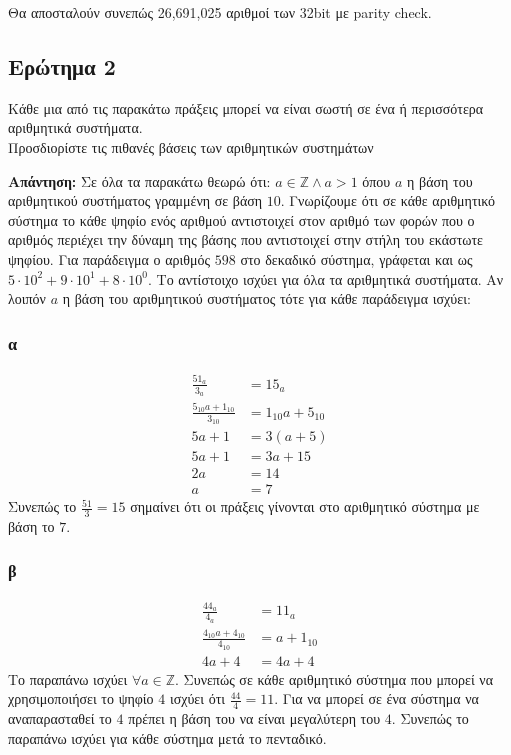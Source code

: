 \documentclass[]{article}
\begin{document}
Θα αποσταλούν συνεπώς 26,691,025 αριθμοί των 32bit με parity check.

\subsection{Ερώτημα 2}
Κάθε μια από τις παρακάτω πράξεις μπορεί να είναι σωστή σε ένα ή περισσότερα αριθμητικά συστήματα. \\
Προσδιορίστε τις πιθανές βάσεις των αριθμητικών συστημάτων

\textbf{Απάντηση: }
Σε όλα τα παρακάτω θεωρώ ότι: $a \in \mathbb{Z} \land a > 1$ όπου $a$ η βάση του αριθμητικού συστήματος γραμμένη σε βάση $10$.
Γνωρίζουμε ότι σε κάθε αριθμητικό σύστημα το κάθε ψηφίο ενός αριθμού αντιστοιχεί στον αριθμό των φορών που ο αριθμός περιέχει την δύναμη της βάσης που αντιστοιχεί στην στήλη του εκάστωτε ψηφίου.
Για παράδειγμα ο αριθμός $598$ στο δεκαδικό σύστημα, γράφεται και ως $5 \cdot 10^2 + 9 \cdot 10^1 + 8 \cdot 10^0$. Το αντίστοιχο ισχύει για όλα τα αριθμητικά συστήματα.
Αν λοιπόν $a$ η βάση του αριθμητικού συστήματος τότε για κάθε παράδειγμα ισχύει:
\subsubsection{α}
\begin{align*}
	\frac{51_a}{3_a}                & = 15_a             \\
	\frac{5_{10}a + 1_{10}}{3_{10}} & = 1_{10}a + 5_{10} \\
	5a + 1                          & = 3(a + 5)         \\
	5a + 1                          & = 3a + 15          \\
	2a                              & = 14               \\
	a                               & = 7
\end{align*}
Συνεπώς το $\frac{51}{3} = 15$ σημαίνει ότι οι πράξεις γίνονται στο αριθμητικό σύστημα με βάση το $7$.

\subsubsection{β}
\begin{align*}
	\frac{44_a}{4_a}                & = 11_a       \\
	\frac{4_{10}a + 4_{10}}{4_{10}} & = a + 1_{10} \\
	4a + 4                          & = 4a + 4
\end{align*}
Το παραπάνω ισχύει $\forall a \in \mathbb{Z}$. Συνεπώς σε κάθε αριθμητικό σύστημα που μπορεί να χρησιμοποιήσει το ψηφίο $4$ ισχύει ότι $\frac{44}{4} = 11$.
Για να μπορεί σε ένα σύστημα να αναπαρασταθεί το $4$ πρέπει η βάση του να είναι μεγαλύτερη του $4$. Συνεπώς το παραπάνω ισχύει για κάθε σύστημα μετά το πενταδικό.
\end{document}
